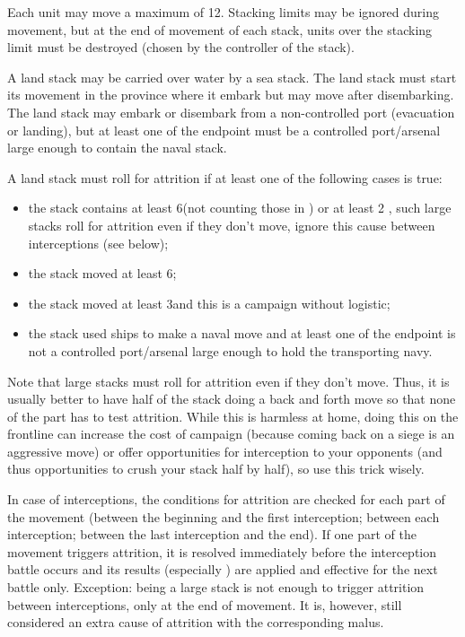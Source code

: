 
Each unit may move a maximum of 12\MP. Stacking limits may be ignored during
movement, but at the end of movement of each stack, units over the stacking
limit must be destroyed (chosen by the controller of the stack).

A land stack may be carried over water by a sea stack. The land stack must
start its movement in the province where it embark but may move after
disembarking. The land stack may embark or disembark from a non-controlled
port (evacuation or landing), but at least one of the endpoint must be a
controlled port/arsenal large enough to contain the naval stack.

A land stack must roll for attrition if at least one of the following cases is
true:
\begin{itemize}
\item the stack contains at least 6\LD (not counting those in \Pasha) or at
  least 2 \Pashas, such large stacks roll for attrition even if they don't
  move, ignore this cause between interceptions (see below);
\item the stack moved at least 6\MP;
\item the stack moved at least 3\MP and this is a campaign without logistic;
\item the stack used ships to make a naval move and at least one of the
  endpoint is not a controlled port/arsenal large enough to hold the
  transporting navy.
\end{itemize}

Note that large stacks must roll for attrition even if they don't move. Thus,
it is usually better to have half of the stack doing a back and forth move so
that none of the part has to test attrition. While this is harmless at home,
doing this on the frontline can increase the cost of campaign (because coming
back on a siege is an aggressive move) or offer opportunities for interception
to your opponents (and thus opportunities to crush your stack half by half),
so use this trick wisely.

In case of interceptions, the conditions for attrition are checked for each
part of the movement (between the beginning and the first interception;
between each interception; between the last interception and the end). If one
part of the movement triggers attrition, it is resolved immediately before the
interception battle occurs and its results (especially ) are
applied and effective for the next battle only. Exception: being a large stack
is not enough to trigger attrition between interceptions, only at the end of
movement. It is, however, still considered an extra cause of attrition with
the corresponding malus.

